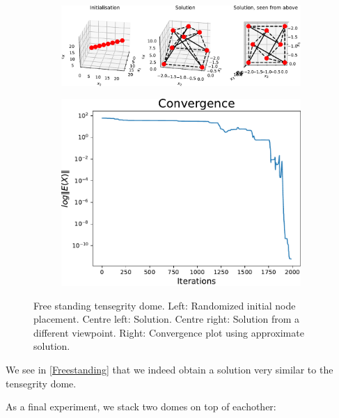 \begin{figure}[!ht]
\centering
\begin{subfigure}{.72\textwidth}
  \centering
  \includegraphics[width=0.99\linewidth]{Bilder/FREESTANDING.pdf}
\end{subfigure}%
\begin{subfigure}{.3\textwidth}
  \centering
  \includegraphics[width=0.99\linewidth]{Bilder/FREESTANDINGconv.pdf}
\end{subfigure}
\caption{Free standing tensegrity dome. Left: Randomized initial node placement. Centre left: Solution. Centre right: Solution from a different viewpoint. Right: Convergence plot using approximate solution.}
\label{Freestanding}
\end{figure}

We see in \eqref{Freestanding} that we indeed obtain a solution very similar to the tensegrity dome.

As a final experiment, we stack two domes on top of eachother:

